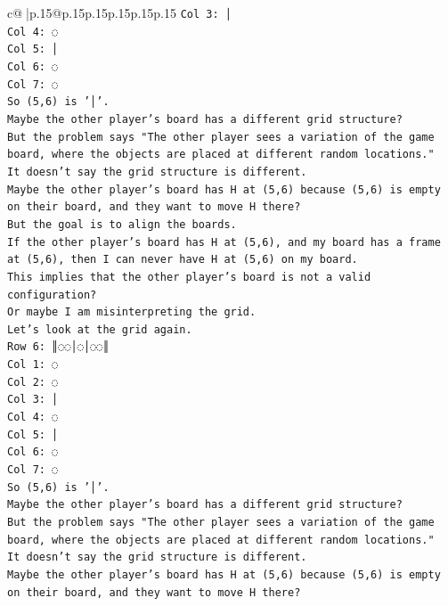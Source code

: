 \documentclass{article}
\begin{document}
{\begin{supertabular}{c@{$\;$}|p{.15\linewidth}@{}p{.15\linewidth}p{.15\linewidth}p{.15\linewidth}p{.15\linewidth}p{.15\linewidth}}
{{{\texttt{Col 3: │} \\
\texttt{Col 4: ◌} \\
\texttt{Col 5: │} \\
\texttt{Col 6: ◌} \\
\texttt{Col 7: ◌} \\
\texttt{So (5,6) is '│'.} \\
\texttt{Maybe the other player's board has a different grid structure?} \\
\texttt{But the problem says "The other player sees a variation of the game board, where the objects are placed at different random locations."} \\
\texttt{It doesn't say the grid structure is different.} \\
\texttt{Maybe the other player's board has H at (5,6) because (5,6) is empty on their board, and they want to move H there?} \\
\texttt{But the goal is to align the boards.} \\
\texttt{If the other player's board has H at (5,6), and my board has a frame at (5,6), then I can never have H at (5,6) on my board.} \\
\texttt{This implies that the other player's board is not a valid configuration?} \\
\texttt{Or maybe I am misinterpreting the grid.} \\
\texttt{Let's look at the grid again.} \\
\texttt{Row 6: ║◌◌│◌│◌◌║} \\
\texttt{Col 1: ◌} \\
\texttt{Col 2: ◌} \\
\texttt{Col 3: │} \\
\texttt{Col 4: ◌} \\
\texttt{Col 5: │} \\
\texttt{Col 6: ◌} \\
\texttt{Col 7: ◌} \\
\texttt{So (5,6) is '│'.} \\
\texttt{Maybe the other player's board has a different grid structure?} \\
\texttt{But the problem says "The other player sees a variation of the game board, where the objects are placed at different random locations."} \\
\texttt{It doesn't say the grid structure is different.} \\
\texttt{Maybe the other player's board has H at (5,6) because (5,6) is empty on their board, and they want to move H there?} \\
}}}
\end{supertabular}}
\end{document}
